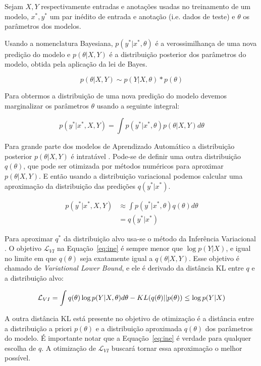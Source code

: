 Sejam $X,Y$ respectivamente entradas e anotações usadas no treinamento de um modelo,
$x^*,y^*$ um par inédito de entrada e anotação (i.e. dados de teste) e
$\theta$ os parâmetros dos modelos.

Usando a nomenclatura Bayesiana, $p(y^* | x^*,\theta)$ é a verossimilhança de
uma nova predição do modelo e $p(\theta | X,Y)$ é a distribuição posterior dos
parâmetros do modelo, obtida pela aplicação da lei de Bayes.

\[
  p(\theta | X,Y) \sim p(Y | X,\theta) * p(\theta)
\]


Para obtermos a distribuição de uma nova predição do modelo devemos marginalizar os parâmetros $\theta$ usando a seguinte integral:

\begin{equation}
  \label{eq:int}
  p(y^* | x^* , X,Y) = \int  p(y^* | x^*,\theta) p(\theta | X,Y)  d\theta 
\end{equation}

Para grande parte dos modelos de Aprendizado Automático a distribuição posterior
$p(\theta | X,Y)$ é intratável \citep{ubertime}. Pode-se de definir uma outra
distribuição $q(\theta)$, que pode ser otimizada por métodos numéricos para
aproximar $p(\theta | X,Y)$. E então usando a distribuição variacional podemos
calcular uma aproximação da distribuição das predições $q(y^*|x^*)$. 

\begin{align*}
  \label {eq:pq}
    p(y^* | x^* , X,Y) &\approx \int  p(y^* | x^*,\theta) q(\theta)d\theta \\
                       &= q(y^* | x^*)
\end{align*}

 Para aproximar $q^*$ da distribuição alvo usa-se o método da Inferência
Variacional \citep{bayesml}. O objetivo $\mathcal{L}_{VI}$ na
Equação~\ref{eq:ine} é sempre menor que $\log p(Y|X)$, e igual no limite em que
$q(\theta)$ seja exatamente igual a $q(\theta | X,Y)$. Esse objetivo é chamado de
\textit{Variational Lower Bound}, e ele é derivado da distância KL entre $q$ e
a distribuição alvo:

\begin{equation}
  \label {eq:ine}
  \mathcal{L}_{VI} = \int q(\theta) \log p(Y | X,\theta)d\theta - \mathnormal{KL}(q(\theta) ||p(\theta)) \\
                  \leq \log p(Y|X)
\end{equation}

A outra distância KL está presente no objetivo de otimização é a
distância entre a distribuição a priori $p(\theta)$ e a distribuição aproximada
$q(\theta)$ dos parâmetros do modelo. É importante notar que a Equação~\ref{eq:ine} é verdade para qualquer escolha de
$q$. A otimização de $\mathcal{L}_{VI}$ buscará tornar essa aproximação o melhor possível.



